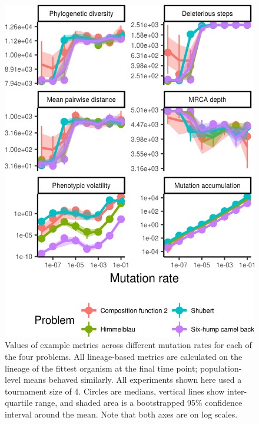 \documentclass[letterpaper]{article}
\newcommand{\reduceCaptionPadding}{\setlength{\belowcaptionskip}{-10pt}}
\begin{document}
\begin{figure}
\includegraphics[width=\columnwidth]{figs/all_mutation_rate_crop.png}
\reduceCaptionPadding
\caption{\small Values of example metrics across different mutation rates for each of the four problems. All lineage-based metrics are calculated on the lineage of the fittest organism at the final time point; %
population-level means behaved similarly. All experiments shown here used a tournament size of 4. Circles are medians, vertical lines show inter-quartile range, and shaded area is a bootstrapped 95\% confidence interval around the mean. Note that both axes are on log scales.}
\label{fig:mutation_rate}
\end{figure}
\end{document}
